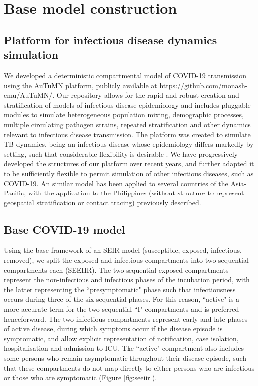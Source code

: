 \section{Base model construction}
\subsection{Platform for infectious disease dynamics simulation}

We developed a deterministic compartmental model of COVID-19 transmission using the AuTuMN platform,
publicly available at https://github.com/monash-emu/AuTuMN/.
Our repository allows for the rapid and robust creation and stratification of models of infectious disease epidemiology and includes pluggable modules to simulate heterogeneous population mixing, demographic processes, multiple circulating pathogen strains, repeated stratification and other dynamics relevant to infectious disease transmission.
The platform was created to simulate TB dynamics, being an infectious disease whose epidemiology differs markedly by setting, such that considerable flexibility is desirable \cite{RN18}.
We have progressively developed the structures of our platform over recent years, and further adapted it to be sufficiently flexible to permit simulation of other infectious diseases, such as COVID-19. An similar model has been applied to several countries of the Asia-Pacific, with the application to the Philippines (without structure to represent geospatial stratification or contact tracing) previously described.\cite{RN79}

\subsection{Base COVID-19 model}
Using the base framework of an SEIR model (susceptible, exposed, infectious, removed), we split the exposed and infectious compartments into two sequential compartments each (SEEIIR). The two sequential exposed compartments represent the non-infectious and infectious phases of the incubation period, with the latter representing the ``presymptomatic" phase such that infectiousness occurs during three of the six sequential phases. For this reason, ``active" is a more accurate term for the two sequential ``I" compartments and is preferred henceforward. The two infectious compartments represent early and late phases of active disease, during which symptoms occur if the disease episode is symptomatic, and allow explicit representation of notification, case isolation, hospitalisation and admission to ICU. The ``active" compartment also includes some persons who remain asymptomatic throughout their disease episode, such that these compartments do not map directly to either persons who are infectious or those who are symptomatic (Figure \ref{fig:seeiir}).

